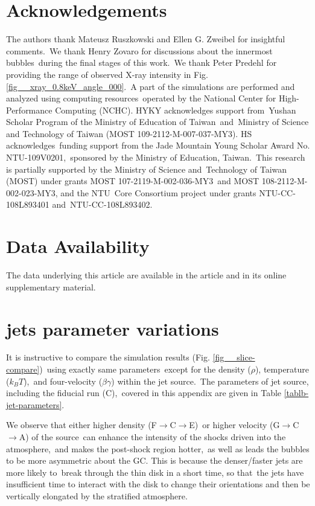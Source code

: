 \documentclass[fleqn,usenatbib,useAMS]{mnras}
\begin{document}
\section{Acknowledgements}
The authors thank Mateusz Ruszkowski and Ellen G. Zweibel for insightful comments.\
We thank Henry Zovaro for discussions about the innermost bubbles\
during the final stages of this work.\
We thank Peter Predehl for providing the range of observed X-ray intensity in Fig. \ref{fig__xray_0.8keV_angle_000}.\
A part of the simulations are performed and analyzed using computing resources\
operated by the National Center for High-Performance Computing (NCHC).
HYKY acknowledges support from\
Yushan Scholar Program of the Ministry of Education of Taiwan\
and\
Ministry of Science and Technology of Taiwan (MOST 109-2112-M-007-037-MY3).
HS acknowledges\
funding support from the Jade Mountain Young Scholar Award No. NTU-109V0201,\
sponsored by the Ministry of Education, Taiwan.\
This research is partially supported by the Ministry of Science and\
Technology of Taiwan (MOST) under grants MOST 107-2119-M-002-036-MY3\
and MOST 108-2112-M-002-023-MY3, and the NTU\
Core Consortium project under grants NTU-CC-108L893401 and\
NTU-CC-108L893402.

\section*{Data Availability}
The data underlying this article are available in the article and in its online supplementary material.






\appendix
\section{jets parameter variations}

It is instructive to compare the simulation results (Fig. \ref{fig__slice-compare})\
using exactly same parameters\
except for the density ($\rho$), temperature ($k_{B}T$),\
and four-velocity ($\beta\gamma$) within the jet source.\
The parameters of jet source, including the fiducial run (C),\
covered in this appendix are given in Table \ref{tablb-jet-parameters}.

We observe that either higher density (F$\rightarrow$C$\rightarrow$E)\
or higher velocity (G$\rightarrow$C$\rightarrow$A) of the source\
can enhance the intensity of the shocks driven into the atmosphere,\
and makes the post-shock region hotter,\
as well as leads the bubbles to be more asymmetric about the GC.
This is because the denser/faster jets are more likely to\
break through the thin disk in a short time, so that\
the jets have insufficient time to interact with the disk to change their orientations and then be vertically elongated by the stratified atmosphere.
\end{document}
